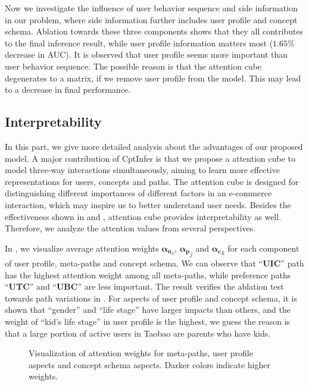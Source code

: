 \noindent
Now we investigate the influence of user behavior sequence and side information in our problem,
where side information further includes user profile and concept schema.
Ablation towards these three components shows that they all contributes to the final inference result, 
while user profile information matters most ($1.65\%$ decrease in AUC).
It is observed that user profile seems more important than user behavior sequence.
The possible reason is that the attention cube degenerates to a matrix, if we remove user profile from the model.
This may lead to a decrease in final performance.



\subsection{Interpretability}
\label{sec:case}

In this part, we give more detailed analysis about the advantages of our proposed model.
A major contribution of CptInfer is that we propose a attention cube to model three-way interactions simultaneously, 
aiming to learn more effective representations for users, concepts and paths.
The attention cube is designed for distinguishing different importances of different factors in an e-commerce interaction, 
which may inspire us to better understand user needs.
Besides the effectiveness shown in  and , attention cube provides interpretability as well.
Therefore, we analyze the attention values from several perspectives.

In , we visualize average attention weights ${\bm{\alpha_u}}_i$, ${\bm{\alpha_p}}_j$ and ${\bm{\alpha_c}}_k$ for each component of user profile, meta-paths and concept schema.
We can observe that ``\textbf{UIC}'' path has the highest attention weight among all meta-paths, while preference paths ``\textbf{UTC}'' and ``\textbf{UBC}'' are less important.
The result verifies the ablation test towards path variations in .
For aspects of user profile and concept schema, 
it is shown that ``gender'' and ``life stage'' have larger impacts than others,
and the weight of ``kid's life stage'' in user profile is the highest, 
we guess the reason is that a large portion of active users in Taobao are parents who have kids.

\begin{figure}[th]
	\centering
	\caption{Visualization of attention weights for meta-paths, user profile aspects and concept schema aspects. Darker colors indicate higher weights.}
	\label{fig:att}
\end{figure}

